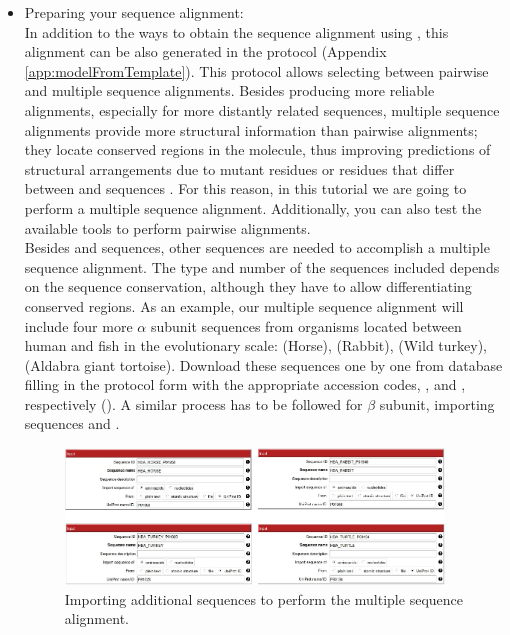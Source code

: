  \begin{itemize}
 \item Preparing your sequence alignment:\\
In addition to the ways to obtain the  sequence alignment using \chimera, this alignment can be also generated in the \scipion protocol  (Appendix \ref{app:modelFromTemplate}). This protocol allows selecting between pairwise and multiple sequence alignments. Besides producing more reliable alignments, especially for more distantly related sequences, multiple sequence alignments provide more structural information than pairwise alignments; they locate conserved regions in the molecule, thus improving predictions of structural arrangements due to mutant residues or residues that differ between  and  sequences \citep{pearson2013}. For this reason, in this tutorial we are going to perform a multiple sequence alignment. Additionally, you can also test the available tools to perform pairwise alignments.\\
 
Besides  and  sequences, other sequences are needed to accomplish a multiple sequence alignment. The type and number of the sequences included depends on the sequence conservation, although they have to allow differentiating conserved regions. As an example, our multiple sequence alignment will include four more  $\alpha$ subunit sequences from organisms located between human and fish in the evolutionary scale:  (Horse),  (Rabbit),  (Wild turkey),  (Aldabra giant tortoise). Download these sequences one by one from  database filling in the  protocol form with the appropriate accession codes, , and , respectively (). A similar process has to be followed for  $\beta$ subunit, importing  sequences  and .

  \begin{figure}[H]
  \centering 
  \captionsetup{width=.7\linewidth} 
  \includegraphics[width=0.95\textwidth]{Images/Fig12}
  \caption{Importing additional sequences to perform the multiple sequence alignment.}
  \label{fig:multialignment_sequences}
  \end{figure}


\end{itemize}
